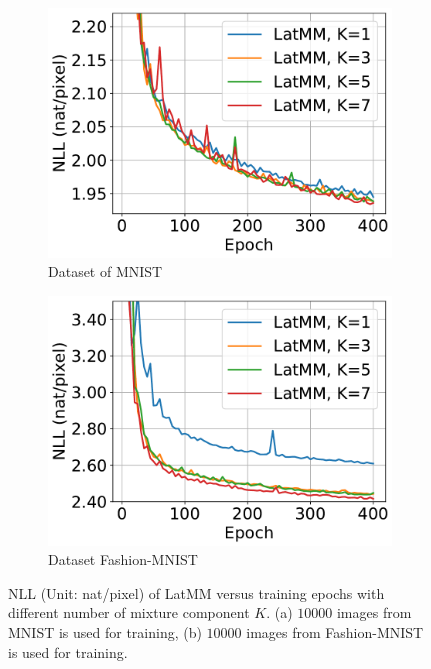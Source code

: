 \begin{figure}[!tp]
  \captionsetup[subfigure]{justification=centering}
  \centering
  \begin{subfigure}{.4\textwidth}
    \centering
    \includegraphics[width=1\linewidth]{images/supply/mnist_LatMM_nll_curves-crop.pdf}
    
    \caption{Dataset of MNIST}
    \label{fig-latmm-mnist-nll-curve}
  \end{subfigure}\hspace{1cm}
  \begin{subfigure}{.4\textwidth}
    \centering
    \includegraphics[width=1\linewidth]{images/supply/fashion_LatMM_nll_curves-crop.pdf}
    
    \caption{Dataset Fashion-MNIST}
    \label{fig-latmm-fsh-nll-curve}
  \end{subfigure}
  
  \caption{NLL (Unit: nat/pixel) of LatMM versus training epochs with different number of mixture component $K$. (a) $10000$ images from MNIST is used for training, (b) $10000$ images from Fashion-MNIST is used for training.}
  \label{fig:latmm-nll}
\end{figure}


